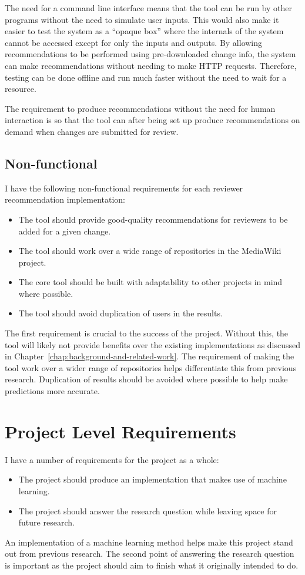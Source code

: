 The need for a command line interface means that the tool can be run by other programs without the need to simulate user inputs. This would also make it easier to test the system as a ``opaque box'' where the internals of the system cannot be accessed except for only the inputs and outputs. By allowing recommendations to be performed using pre-downloaded change info, the system can make recommendations without needing to make HTTP requests. Therefore, testing can be done offline and run much faster without the need to wait for a resource.

The requirement to produce recommendations without the need for human interaction is so that the tool can after being set up produce recommendations on demand when changes are submitted for review.

\subsection{Non-functional}
I have the following non-functional requirements for each reviewer recommendation implementation:
\begin{itemize}
    \item The tool should provide good-quality recommendations for reviewers to be added for a given change.
    \item The tool should work over a wide range of repositories in the MediaWiki project.
    \item The core tool should be built with adaptability to other projects in mind where possible.
    \item The tool should avoid duplication of users in the results.
\end{itemize}

The first requirement is crucial to the success of the project. Without this, the tool will likely not provide benefits over the existing implementations as discussed in Chapter~\ref{chap:background-and-related-work}. The requirement of making the tool work over a wider range of repositories helps differentiate this from previous research. Duplication of results should be avoided where possible to help make predictions more accurate.

\section{Project Level Requirements}

I have a number of requirements for the project as a whole:
\begin{itemize}
    \item The project should produce an implementation that makes use of machine learning.
    \item The project should answer the research question while leaving space for future research.
\end{itemize}

An implementation of a machine learning method helps make this project stand out from previous research. The second point of answering the research question is important as the project should aim to finish what it originally intended to do.

